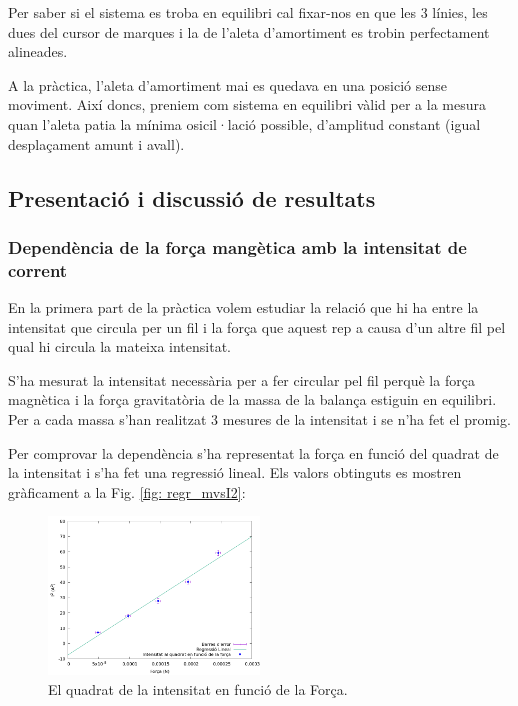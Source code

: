 \documentclass[11pt]{article}
\numberwithin{equation}{section}
\numberwithin{figure}{section}
\numberwithin{table}{section}
\begin{document}

Per saber si el sistema es troba en equilibri cal fixar-nos en que les 3 línies, les dues del cursor de marques i la de l'aleta d'amortiment es trobin perfectament alineades. 

A la pràctica, l'aleta d'amortiment mai es quedava en una posició sense moviment. Així doncs, preniem com sistema en equilibri vàlid per a la mesura quan l'aleta patia la mínima osicil·lació possible, d'amplitud constant (igual desplaçament amunt i avall).

\subsection{Presentació i discussió de resultats}\label{sec: PR2_resultats}

\subsubsection{Dependència de la força mangètica amb la intensitat de corrent}\label{sec: PR2_Fm_intensitat}

En la primera part de la pràctica volem estudiar la relació que hi ha entre la intensitat que circula per un fil i la força que aquest rep a causa d’un altre fil pel qual hi circula la mateixa intensitat. 

S’ha mesurat la intensitat necessària per a fer circular pel fil perquè la força magnètica i la força gravitatòria de la massa de la balança estiguin en equilibri. Per a cada massa s’han realitzat 3 mesures de la intensitat i se n’ha fet el promig.

Per comprovar la dependència s’ha representat la força en funció del quadrat de la intensitat i s’ha fet una regressió lineal. Els
valors obtinguts es mostren gràficament a la Fig. \ref{fig: regr_mvsI2}:

\begin{figure}[H]
    \centering
    \includegraphics[width=0.5\textwidth]{PR2_regr_I2vsF.png}
    \caption{El quadrat de la intensitat en funció de la Força.}
    \label{fig: PR2_regr_I2vsF}
\end{figure}
\end{document}
